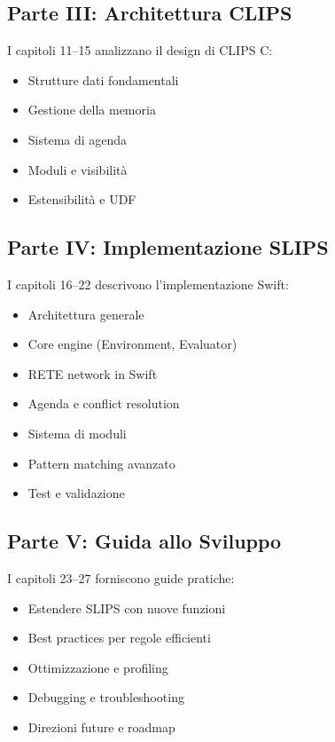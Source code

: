\subsection{Parte III: Architettura CLIPS}

I capitoli 11--15 analizzano il design di CLIPS C:

\begin{itemize}
\item Strutture dati fondamentali
\item Gestione della memoria
\item Sistema di agenda
\item Moduli e visibilità
\item Estensibilità e UDF
\end{itemize}

\subsection{Parte IV: Implementazione SLIPS}

I capitoli 16--22 descrivono l'implementazione Swift:

\begin{itemize}
\item Architettura generale
\item Core engine (Environment, Evaluator)
\item RETE network in Swift
\item Agenda e conflict resolution
\item Sistema di moduli
\item Pattern matching avanzato
\item Test e validazione
\end{itemize}

\subsection{Parte V: Guida allo Sviluppo}

I capitoli 23--27 forniscono guide pratiche:

\begin{itemize}
\item Estendere SLIPS con nuove funzioni
\item Best practices per regole efficienti
\item Ottimizzazione e profiling
\item Debugging e troubleshooting
\item Direzioni future e roadmap
\end{itemize}


